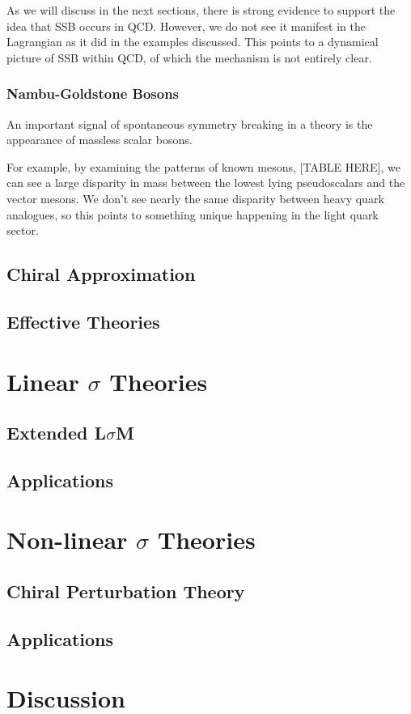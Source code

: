 \documentclass[aps,prd,onecolumn,showpacs,amsmath,amssymb,nofootinbib]{revtex4} \pdfoutput=1
\begin{document}
As we will discuss in the next sections, there is strong evidence to support the idea that SSB occurs in QCD. However, we do not see it manifest in the Lagrangian as it did in the examples discussed. This points to a dynamical picture of SSB within QCD, of which the mechanism is not entirely clear. 
\subsubsection{Nambu-Goldstone Bosons}
An important signal of spontaneous symmetry breaking in a theory is the appearance of massless scalar bosons.

For example, by examining the patterns of known mesons, [TABLE HERE], we can see a large disparity in mass between the lowest lying pseudoscalars and the vector mesons. 
We don't see nearly the same disparity between heavy quark analogues, so this points to something unique happening in the light quark sector.

\subsection{Chiral Approximation}
\subsection{Effective Theories}

\section{Linear $\sigma$ Theories}\label{IV}
\subsection{Extended L$\sigma$M}
\subsection{Applications}
\section{Non-linear $\sigma$ Theories}\label{V}
\subsection{Chiral Perturbation Theory}
\subsection{Applications}

\section{Discussion}\label{VI}

\clearpage
%

\end{document}
